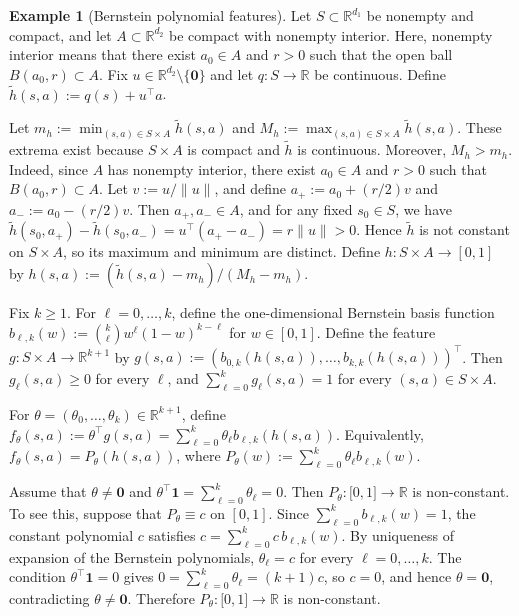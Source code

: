 \documentclass{amsart}
\theoremstyle{definition}
\newtheorem{example}{Example}
\begin{document}
\begin{example}[Bernstein polynomial features]\label{ex:Bernstein_Poly_MDP}
Let $S\subset\mathbb R^{d_1}$ be nonempty and compact, and let $A\subset\mathbb R^{d_2}$ be compact with nonempty interior. 
Here, nonempty interior means that there exist $a_0\in A$ and $r>0$ such that the open ball $B(a_0,r)\subset A$. 
Fix $u\in\mathbb R^{d_2}\setminus\{\mathbf 0\}$ and let $q:S\to\mathbb R$ be continuous. Define $\widetilde h(s,a):=q(s)+u^\top a$.

Let $m_h:=\min_{(s,a)\in S\times A}\widetilde h(s,a)$ and $M_h:=\max_{(s,a)\in S\times A}\widetilde h(s,a)$. 
These extrema exist because $S\times A$ is compact and $\widetilde h$ is continuous. 
Moreover, $M_h>m_h$. 
Indeed, since $A$ has nonempty interior, there exist $a_0\in A$ and $r>0$ such that $B(a_0,r)\subset A$. 
Let $v:=u/\|u\|$, and define $a_+:=a_0+(r/2)v$ and $a_-:=a_0-(r/2)v$. 
Then $a_+,a_-\in A$, and for any fixed $s_0\in S$, we have $\widetilde h(s_0,a_+)-\widetilde h(s_0,a_-)=u^\top(a_+-a_-)=r\|u\|>0$. 
Hence $\widetilde h$ is not constant on $S\times A$, so its maximum and minimum are distinct. 
Define $h:S\times A\to[0,1]$ by $h(s,a):=(\widetilde h(s,a)-m_h)/(M_h-m_h)$.

Fix $k\geq 1$. 
For $\ell=0,\dots,k$, define the one-dimensional Bernstein basis function $b_{\ell,k}(w):=\binom{k}{\ell}w^\ell(1-w)^{k-\ell}$ for $w\in[0,1]$. 
Define the feature $g:S\times A\to\mathbb R^{k+1}$ by $g(s,a):=(b_{0,k}(h(s,a)),\dots,b_{k,k}(h(s,a)))^\top$. 
Then $g_\ell(s,a)\geq 0$ for every $\ell$, and $\sum_{\ell=0}^k g_\ell(s,a)=1$ for every $(s,a)\in S\times A$.

For $\theta=(\theta_0,\dots,\theta_k)\in\mathbb R^{k+1}$, define $f_\theta(s,a):=\theta^\top g(s,a)=\sum_{\ell=0}^k\theta_\ell b_{\ell,k}(h(s,a))$. 
Equivalently, $f_\theta(s,a)=P_\theta(h(s,a))$, where $P_\theta(w):=\sum_{\ell=0}^k\theta_\ell b_{\ell,k}(w)$.

Assume that $\theta\neq \mathbf 0$ and $\theta^\top\mathbf 1=\sum_{\ell=0}^k\theta_\ell=0$. 
Then $P_\theta : \mathbb [0,1] \to \mathbb R$ is non-constant. 
To see this, suppose that $P_\theta\equiv c$ on $[0,1]$. 
Since $\sum_{\ell=0}^k b_{\ell,k}(w)=1$, the constant polynomial $c$ satisfies $c=\sum_{\ell=0}^k c\,b_{\ell,k}(w)$. 
By uniqueness of expansion of the Bernstein polynomials, $\theta_\ell=c$ for every $\ell=0,\dots,k$. 
The condition $\theta^\top\mathbf 1=0$ gives $0=\sum_{\ell=0}^k\theta_\ell=(k+1)c$, so $c=0$, and hence $\theta=\mathbf0$, contradicting $\theta \neq \mathbf 0$.
Therefore $P_\theta : \mathbb [0,1] \to \mathbb R$ is non-constant.


\end{example}
\end{document}
